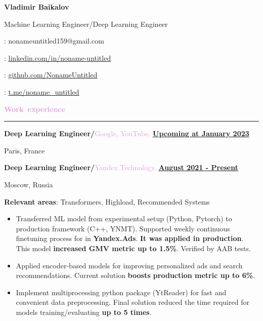 \documentclass[11pt,a4paper]{report}
\author{Vladimir Baikalov}
\begin{document}
\noindent
\begin{minipage}[c]{0.66\linewidth}
\Huge{\textbf{Vladimir Baikalov}}

\small{Machine Learning Engineer/Deep Learning Engineer}
\end{minipage} %
\begin{minipage}[c]{0.33\linewidth}
\Letter: nonameuntitled159@gmail.com

\faLinkedin : \href{https://www.linkedin.com/in/noname-untitled}{linkedin.com/in/noname-untitled}

\faGithub:  \href{http://www.github.com/NonameUntitled}{github.com/NonameUntitled}

\faSend:  \href{http://www.t.me/noname\_untitled}{t.me/noname\_untitled}

\end{minipage}

\par\hbox{\Large{\textcolor{Plum}{\textbf{Work experience}}}}\kern3pt\hrule\kern5pt


\textbf{\large{Deep Learning Engineer/}}\textcolor{Plum}{Google, YouTube.}
\hfill
\textbf {\underline{Upcoming at January 2023}}

Paris, France

\vspace{2mm}

\textbf{\large{Deep Learning Engineer/}}\textcolor{Plum}{Yandex Technology.}
\hfill
\textbf {\underline{August 2021 - Present}}

Moscow, Russia

\textbf{Relevant areas}: Transformers, Highload, Recommended Systems
\begin{itemize}[label={}, left=10pt]

    \item  Transferred ML model from experimental setup (Python, Pytorch) to production framework (C++, YNMT). Supported weekly continuous finetuning process for in \textbf{Yandex.Ads}. \textbf{It was applied in production}. This model \textbf{increased GMV metric up to 1.5\%}. Verified by AAB tests.
    
    \item Applied encoder-based models for improving personalized ads and search recommendations. Current solution \textbf{boosts production metric up to 6\%}.
    
    \item Implement multiprocessing python package (YtReader) for fast and convenient data preprocessing. Final solution reduced the time required for models training/evaluating \textbf{up to 5 times}. 
\end{itemize}
\end{document}
